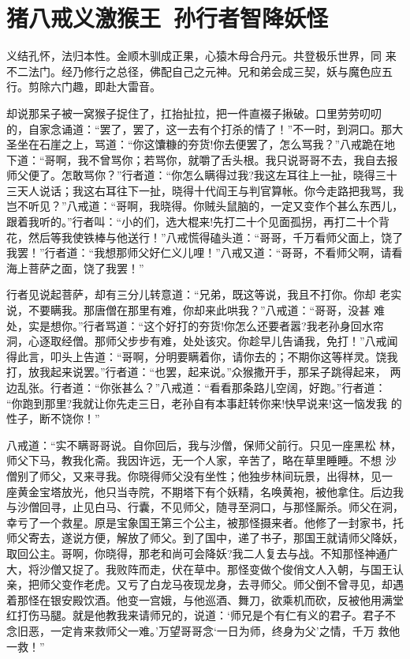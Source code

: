 \chapter{猪八戒义激猴王~孙行者智降妖怪}

义结孔怀，法归本性。金顺木驯成正果，心猿木母合丹元。共登极乐世界，同
来不二法门。经乃修行之总径，佛配自己之元神。兄和弟会成三契，妖与魔色应五
行。剪除六门趣，即赴大雷音。

却说那呆子被一窝猴子捉住了，扛抬扯拉，把一件直裰子揪破。口里劳劳叨叨
的，自家念诵道：“罢了，罢了，这一去有个打杀的情了！”不一时，到洞口。那大
圣坐在石崖之上，骂道：“你这馕糠的夯货!你去便罢了，怎么骂我？”八戒跪在地
下道：“哥啊，我不曾骂你；若骂你，就嚼了舌头根。我只说哥哥不去，我自去报
师父便了。怎敢骂你？”行者道：“你怎么瞒得过我?我这左耳往上一扯，晓得三十
三天人说话；我这右耳往下一扯，晓得十代阎王与判官算帐。你今走路把我骂，我
岂不听见？”八戒道：“哥啊，我晓得。你贼头鼠脑的，一定又变作个甚么东西儿，
跟着我听的。”行者叫：“小的们，选大棍来!先打二十个见面孤拐，再打二十个背
花，然后等我使铁棒与他送行！”八戒慌得磕头道：“哥哥，千万看师父面上，饶了
我罢！”行者道：“我想那师父好仁义儿哩！”八戒又道：“哥哥，不看师父啊，请看
海上菩萨之面，饶了我罢！”

行者见说起菩萨，却有三分儿转意道：“兄弟，既这等说，我且不打你。你却
老实说，不要瞒我。那唐僧在那里有难，你却来此哄我？”八戒道：“哥哥，没甚
难处，实是想你。”行者骂道：“这个好打的夯货!你怎么还要者嚣?我老孙身回水帘
洞，心逐取经僧。那师父步步有难，处处该灾。你趁早儿告诵我，免打！”八戒闻
得此言，叩头上告道：“哥啊，分明要瞒着你，请你去的；不期你这等样灵。饶我
打，放我起来说罢。”行者道：“也罢，起来说。”众猴撒开手，那呆子跳得起来，
两边乱张。行者道：“你张甚么？”八戒道：“看看那条路儿空阔，好跑。”行者道：
“你跑到那里?我就让你先走三日，老孙自有本事赶转你来!快早说来!这一恼发我
的性子，断不饶你！”

八戒道：“实不瞒哥哥说。自你回后，我与沙僧，保师父前行。只见一座黑松
林，师父下马，教我化斋。我因许远，无一个人家，辛苦了，略在草里睡睡。不想
沙僧别了师父，又来寻我。你晓得师父没有坐性；他独步林间玩景，出得林，见一
座黄金宝塔放光，他只当寺院，不期塔下有个妖精，名唤黄袍，被他拿住。后边我
与沙僧回寻，止见白马、行囊，不见师父，随寻至洞口，与那怪厮杀。师父在洞，
幸亏了一个救星。原是宝象国王第三个公主，被那怪摄来者。他修了一封家书，托
师父寄去，遂说方便，解放了师父。到了国中，递了书子，那国王就请师父降妖，
取回公主。哥啊，你晓得，那老和尚可会降妖?我二人复去与战。不知那怪神通广
大，将沙僧又捉了。我败阵而走，伏在草中。那怪变做个俊俏文人入朝，与国王认
亲，把师父变作老虎。又亏了白龙马夜现龙身，去寻师父。师父倒不曾寻见，却遇
着那怪在银安殿饮酒。他变一宫娥，与他巡酒、舞刀，欲乘机而砍，反被他用满堂
红打伤马腿。就是他教我来请师兄的，说道：‘师兄是个有仁有义的君子。君子不
念旧恶，一定肯来救师父一难。’万望哥哥念‘一日为师，终身为父’之情，千万
救他一救！”

